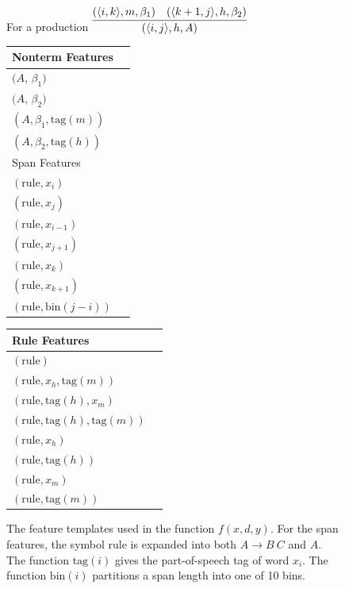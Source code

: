 \documentclass[11pt,letterpaper]{article}
\newcommand{\Span}[1]{\langle #1 \rangle}
\newcommand{\RuleSym}{\mathrm{rule}}
\newcommand{\Rule}[3]{#1 \rightarrow #2\ #3}
\newcommand{\BinFN}[1]{\mathrm{bin}({#1})}
\newcommand{\TagFN}[1]{\mathrm{tag}({#1})}
\newcommand{\WordFN}[1]{x_{#1}}
\begin{document}
\begin{figure}
  \footnotesize
  \centering
  For a production $ \infer{(\Span{i, j}, h, A)}{(\Span{i, k}, m, \beta_1) &  (\Span{k+1, j}, h, \beta_2)} $

  \vspace{0.5cm}

  \begin{multicols}{2}

  \begin{tabular}{|l|l}

  \hline
  Nonterm Features \\
  \hline

  \hline
  $(A$, $\beta_1)$ \\
  $(A$, $\beta_2)$ \\
  $(A, \beta_1, \TagFN{m})$ \\
  $(A, \beta_2, \TagFN{h})$ \\
  \hline
    \hline
  Span Features \\
  \hline

  \hline
  $(\RuleSym, \WordFN{i})$\\
  $(\RuleSym, \WordFN{j})$\\
  $(\RuleSym, \WordFN{i-1})$\\
  $(\RuleSym, \WordFN{j+1})$\\
  $(\RuleSym, \WordFN{k})$\\
  $(\RuleSym, \WordFN{k+1})$\\
  $(\RuleSym, \BinFN{j-i})$\\
  \hline

  \end{tabular}

  \begin{tabular}{|l|l}

  \hline


  Rule Features \\
  \hline

  \hline

  $(\RuleSym  )$\\
  $(\RuleSym, \WordFN{h}, \TagFN{m})$ \\
  $(\RuleSym, \TagFN{h}, \WordFN{m})$ \\
  $(\RuleSym, \TagFN{h}, \TagFN{m})$ \\

  $(\RuleSym, \WordFN{h})$ \\
  $(\RuleSym, \TagFN{h})$ \\
  $(\RuleSym, \WordFN{m})$ \\
  $(\RuleSym, \TagFN{m})$ \\

  \hline

  \end{tabular}
  \end{multicols}

  \caption{The feature templates used in the function $f(x, d, y)$. For the span features, the symbol $\RuleSym$ is expanded into both $\Rule{A}{B}{C}$ and $A$. The function $\TagFN{i}$ gives the part-of-speech tag of word $x_i$. The function $\BinFN{i}$ partitions a span length into one of 10 bins.
   \label{fig:features} }
\end{figure}
\end{document}
